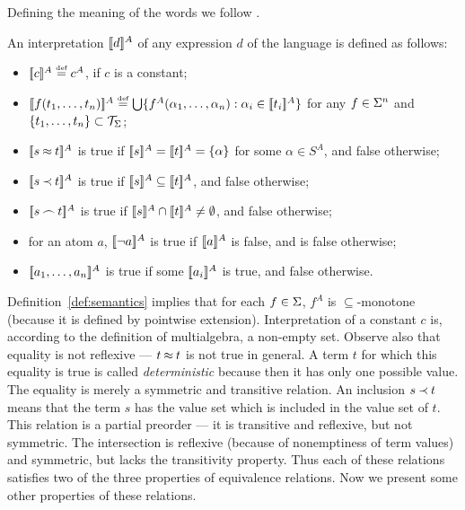 Defining the meaning of the words we follow \cite{MW,Mich}.
\begin{DEFINITION} \label{def:semantics}
An interpretation
\(\Interpret d\) of any expression $d$ of the language is defined as follows: 
\begin{itemize}\MyLPar
\item \(\Interpret c \Def c^A\), if $c$ is a constant;
\item \(\Interpret{f(\List tn,)} \Def \bigcup\{f^A(\List\alpha n,):
  \alpha_i\in\Interpret {t_i}\}\) 
for any \(f\in \Funcs^n\) and \(\{\List
  tn,\}\subset \GTerms\);
\item \(\Interpret{s\Eq t}\) is true if \(\Interpret s=\Interpret
  t=\{\alpha\}\) for some $\alpha\in S^A$, and false otherwise;
\item \(\Interpret{s\Incl t}\) is true if \(\Interpret s\subseteq\Interpret
  t\), and false otherwise;
\item \(\Interpret{s\Int t}\) is true if \(\Interpret s\cap \Interpret
  t \not = \es\), and false otherwise;
\item for an atom $a$, \(\Interpret{\neg a}\) is true if \(\Interpret{a}\) 
 is false, and is false otherwise;
\item \(\Interpret{\List an,}\) is true if some
  \(\Interpret{a_i}\) is true, and false otherwise.
\end{itemize}
\end{DEFINITION}
Definition~\ref {def:semantics} implies that for each \(f\in \Funcs\), \(f^A\)
is \(\subseteq\)-monotone (because it is defined by pointwise extension).
Interpretation of a constant $c$ is, according to the definition of
multialgebra, a non-empty set. Observe also that equality is not reflexive ---
\(t\Eq t\) is not true in general. A term $t$ for which this equality is true
is called {\em deterministic} because then it has only one possible value. The
equality is merely a symmetric and transitive relation. An inclusion \(s\Incl
t\) means that the term $s$ has the value set which is included in the value
set of $t$. This relation is a partial preorder --- it is transitive and
reflexive, but not symmetric. The intersection is reflexive (because of
nonemptiness of term values) and symmetric, but lacks the transitivity
property. Thus each of these relations satisfies two of the three properties
of equivalence relations.  Now we present some other properties of these
relations.\\[8pt]

